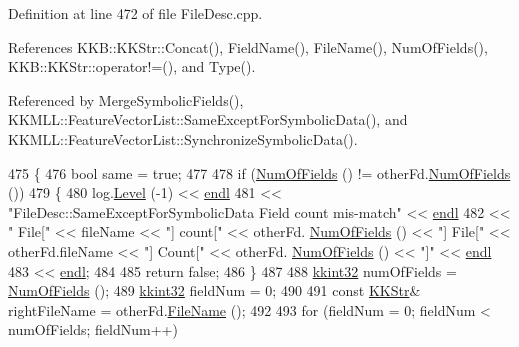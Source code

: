 Definition at line 472 of file File\+Desc.\+cpp.



References K\+K\+B\+::\+K\+K\+Str\+::\+Concat(), Field\+Name(), File\+Name(), Num\+Of\+Fields(), K\+K\+B\+::\+K\+K\+Str\+::operator!=(), and Type().



Referenced by Merge\+Symbolic\+Fields(), K\+K\+M\+L\+L\+::\+Feature\+Vector\+List\+::\+Same\+Except\+For\+Symbolic\+Data(), and K\+K\+M\+L\+L\+::\+Feature\+Vector\+List\+::\+Synchronize\+Symbolic\+Data().


\begin{DoxyCode}
475 \{
476   \textcolor{keywordtype}{bool}  same = \textcolor{keyword}{true};
477 
478   \textcolor{keywordflow}{if}  (\hyperlink{class_k_k_m_l_l_1_1_file_desc_a07abdfb77949dee565c555c7651581c2}{NumOfFields} () != otherFd.\hyperlink{class_k_k_m_l_l_1_1_file_desc_a07abdfb77949dee565c555c7651581c2}{NumOfFields} ())
479   \{
480     log.\hyperlink{class_k_k_b_1_1_run_log_a32cf761d7f2e747465fd80533fdbb659}{Level} (-1) << \hyperlink{namespace_k_k_b_ad1f50f65af6adc8fa9e6f62d007818a8}{endl}
481                    << \textcolor{stringliteral}{"FileDesc::SameExceptForSymbolicData    Field count mis-match"} << 
      \hyperlink{namespace_k_k_b_ad1f50f65af6adc8fa9e6f62d007818a8}{endl}
482                    << \textcolor{stringliteral}{"          File["} << fileName << \textcolor{stringliteral}{"] count["} << otherFd.
      \hyperlink{class_k_k_m_l_l_1_1_file_desc_a07abdfb77949dee565c555c7651581c2}{NumOfFields} () << \textcolor{stringliteral}{"]  File["} << otherFd.fileName << \textcolor{stringliteral}{"] Count["} << otherFd.
      \hyperlink{class_k_k_m_l_l_1_1_file_desc_a07abdfb77949dee565c555c7651581c2}{NumOfFields} () << \textcolor{stringliteral}{"]"} << \hyperlink{namespace_k_k_b_ad1f50f65af6adc8fa9e6f62d007818a8}{endl}
483                    << \hyperlink{namespace_k_k_b_ad1f50f65af6adc8fa9e6f62d007818a8}{endl};
484 
485     \textcolor{keywordflow}{return}  \textcolor{keyword}{false};
486   \}
487 
488   \hyperlink{namespace_k_k_b_a8fa4952cc84fda1de4bec1fbdd8d5b1b}{kkint32}  numOfFields = \hyperlink{class_k_k_m_l_l_1_1_file_desc_a07abdfb77949dee565c555c7651581c2}{NumOfFields} ();
489   \hyperlink{namespace_k_k_b_a8fa4952cc84fda1de4bec1fbdd8d5b1b}{kkint32}  fieldNum = 0;
490 
491   \textcolor{keyword}{const} \hyperlink{class_k_k_b_1_1_k_k_str}{KKStr}&  rightFileName = otherFd.\hyperlink{class_k_k_m_l_l_1_1_file_desc_a5b4f2ac77be5c0d49cbd94eeb463cfed}{FileName} ();
492 
493   \textcolor{keywordflow}{for}  (fieldNum = 0;  fieldNum < numOfFields;  fieldNum++)

\end{DoxyCode}
